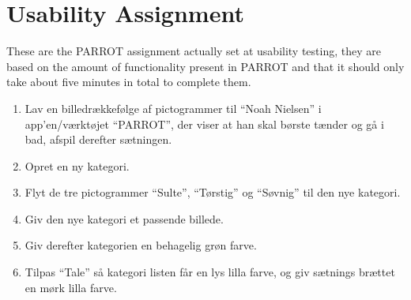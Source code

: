 \section{Usability Assignment}
\label{sec:UseQuest}
These are the PARROT assignment actually set at usability testing, they are based on the amount of functionality present in PARROT and that it should only take about five minutes in total to complete them.

\begin{enumerate}
	\item Lav en billedr\ae{}kkef\o{}lge af pictogrammer til "`Noah Nielsen"' i app'en/v\ae{}rkt\o{}jet "`PARROT"', der viser at han skal b\o{}rste t\ae{}nder og g\aa{} i bad, afspil derefter s\ae{}tningen.
	\item Opret en ny kategori.
	\item Flyt de tre pictogrammer "`Sulte"', "`T\o{}rstig"' og "`S\o{}vnig"' til den nye kategori.
	\item Giv den nye kategori et passende billede.
	\item Giv derefter kategorien en behagelig gr\o{}n farve.
	\item Tilpas "`Tale"' s\aa{} kategori listen f\aa{}r en lys lilla farve, og giv s\ae{}tnings br\ae{}ttet en m\o{}rk lilla farve.
\end{enumerate}